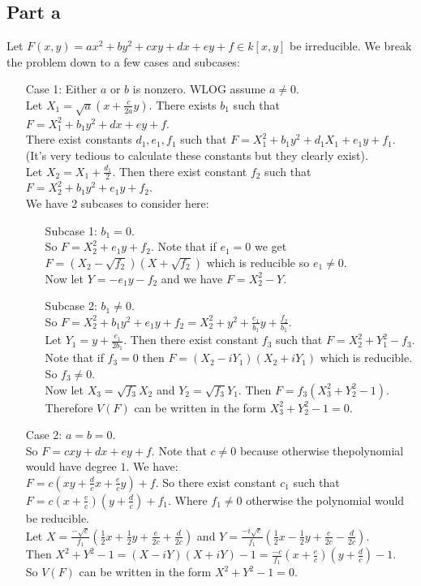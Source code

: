 \documentclass[12pt]{article}
\begin{document}
\subsection*{Part a}
Let $F(x,y)=ax^2+by^2+cxy+dx+ey+f \in k[x,y]$ be irreducible. We break the problem down to a few cases and subcases:
\begin{enumerate}
\item[Case 1:] Either $a$ or $b$ is nonzero. WLOG assume $a \not= 0$. \\
Let $X_1=\sqrt{a}(x+\frac{c}{2a}y)$. There exists $b_1$ such that $F=X_1^2+b_1y^2+dx+ey+f$. \\
There exist constants $d_1,e_1,f_1$ such that
$F=X_1^2+b_1y^2+d_1X_1+e_1y+f_1$. (It's very tedious to calculate these constants but they clearly exist).
\\
Let $X_2=X_1+\frac{d_1}{2}$. Then there exist constant $f_2$ such that
$F=X_2^2+b_1y^2+e_1y+f_2$. \\
We have 2 subcases to consider here:
\begin{enumerate}
\item[Subcase 1:] $b_1=0$. \\
So $F=X_2^2+e_1y+f_2$. Note that if $e_1=0$ we get
$F=(X_2-\sqrt{f_2})(X+\sqrt{f_2})$ which is reducible so $e_1 \not=0$. \\
Now let $Y=-e_1y-f_2$ and we have
$F=X_2^2-Y$.
\item[Subcase 2:] $b_1 \not=0$. \\
So $F=X_2^2+b_1y^2+e_1y+f_2=X_2^2+y^2+\frac{e_1}{b_1}y+\frac{f_2}{b_1}$. \\
Let $Y_1=y+\frac{e_1}{2b_1}$. Then there exist constant $f_3$ such that
$F=X_2^2+Y_1^2-f_3$. Note that if $f_3=0$ then
$F=(X_2-iY_1)(X_2+iY_1)$ which is reducible. So $f_3 \not=0$. \\
Now let $X_3=\sqrt{f_3}X_2$ and $Y_2=\sqrt{f_3}Y_1$. Then $F=f_3(X_3^2+Y_2^2-1)$. Therefore $V(F)$ can be written in the form $X_3^2+Y_2^2-1=0$.
\end{enumerate}
\item[Case 2:] $a=b=0$. \\
So $F=cxy+dx+ey+f$. Note that $c \not=0$ because otherwise thepolynomial would have degree $1$.
We have: \\
$F=c(xy+\frac{d}{c}x+\frac{e}{c}y)+f$. So there exist constant $c_1$ such that
$F=c(x+\frac{e}{c})(y+\frac{d}{c})+f_1$. Where $f_1 \not=0$ otherwise the polynomial would be reducible. \\

Let $X=\frac{-\sqrt{c}}{f_1}(\frac{1}{2}x+\frac{1}{2}y+\frac{e}{2c}+\frac{d}{2c})$ and 
$Y=\frac{-i \sqrt{c}}{f_1}(\frac{1}{2}x-\frac{1}{2}y+\frac{e}{2c}-\frac{d}{2c})$.\\ 
Then $X^2+Y^2-1=(X-iY)(X+iY)-1=\frac{-c}{f_1}(x+\frac{e}{c})(y+\frac{d}{c})-1$. \\
So $V(F)$  can be written in the form $X^2+Y^2-1=0$.


\end{enumerate}
\end{document}
